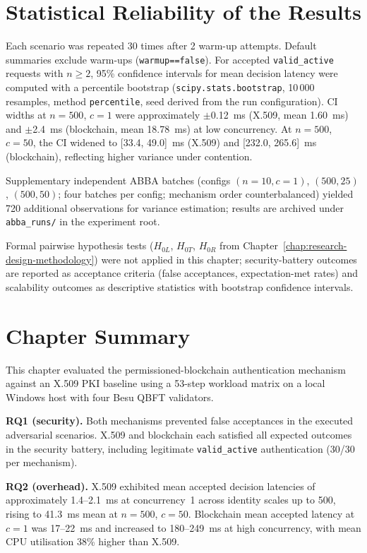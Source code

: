 \section{Statistical Reliability of the Results}
\label{sec:ch5-stats}

Each scenario was repeated 30 times after 2 warm-up attempts. Default summaries exclude warm-ups (\texttt{warmup==false}). For accepted \texttt{valid\_active} requests with $n \geq 2$, 95\% confidence intervals for mean decision latency were computed with a percentile bootstrap (\texttt{scipy.stats.bootstrap}, 10\,000 resamples, method \texttt{percentile}, seed derived from the run configuration). CI widths at $n=500$, $c=1$ were approximately $\pm$0.12~ms (X.509, mean 1.60~ms) and $\pm$2.4~ms (blockchain, mean 18.78~ms) at low concurrency. At $n=500$, $c=50$, the CI widened to [33.4, 49.0]~ms (X.509) and [232.0, 265.6]~ms (blockchain), reflecting higher variance under contention.

Supplementary independent ABBA batches (configs $(n{=}10,c{=}1)$, $(500,25)$, $(500,50)$; four batches per config; mechanism order counterbalanced) yielded 720 additional observations for variance estimation; results are archived under \texttt{abba\_runs/} in the experiment root.

Formal pairwise hypothesis tests ($H_{0L}$, $H_{0T}$, $H_{0R}$ from Chapter~\ref{chap:research-design-methodology}) were not applied in this chapter; security-battery outcomes are reported as acceptance criteria (false acceptances, expectation-met rates) and scalability outcomes as descriptive statistics with bootstrap confidence intervals.

\section{Chapter Summary}
\label{sec:ch5-summary}

This chapter evaluated the permissioned-blockchain authentication mechanism against an X.509 PKI baseline using a 53-step workload matrix on a local Windows host with four Besu QBFT validators.

\textbf{RQ1 (security).} Both mechanisms prevented false acceptances in the executed adversarial scenarios. X.509 and blockchain each satisfied all expected outcomes in the security battery, including legitimate \texttt{valid\_active} authentication (30/30 per mechanism).

\textbf{RQ2 (overhead).} X.509 exhibited mean accepted decision latencies of approximately 1.4--2.1~ms at concurrency~1 across identity scales up to 500, rising to 41.3~ms mean at $n=500$, $c=50$. Blockchain mean accepted latency at $c=1$ was 17--22~ms and increased to 180--249~ms at high concurrency, with mean CPU utilisation 38\% higher than X.509.

